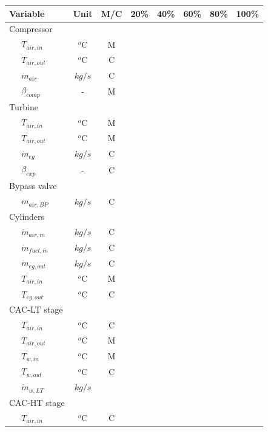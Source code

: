 \documentclass[preprint,12pt]{elsarticle}
\begin{document}
\begin{table}
	\small
	\centering
	\begin{tabular}{llccrrrrr}
		\hline
		\multicolumn{2}{l}{Variable} & Unit & M/C & 20\% & 40\% & 60\% & 80\% & 100\% \\
		\hline
		\multicolumn{2}{l}{Compressor} & & & & & & & \\ 
		& 	$T_{air,in}$  		& $^o$C & M  & &  & & & \\ 
		&	$T_{air,out}$  		& $^o$C & C  & & & & &  \\ 
		&	$\dot{m}_{air}$  	& $kg/s$ & C  & & & & &  \\
		&   $\beta_{comp}$		& - 	& M & & & & &  \\
		\multicolumn{2}{l}{Turbine} & & & & & & &  \\
		&	$T_{air,in}$   		& $^o$C & M  & & & & &  \\ 
		&	$T_{air,out}$  		& $^o$C & M  & & & & &  \\ 
		&	$\dot{m}_{eg}$  	& $kg/s$ & C  & & & & &  \\
		&   $\beta_{exp}$		& - 	& C & & & & &  \\
		\multicolumn{2}{l}{Bypass valve} & & & & & & &  \\
		&	$\dot{m}_{air,BP}$	& $kg/s$ & C  & & & & &  \\ 
		\multicolumn{2}{l}{Cylinders} & & & & & & &   \\
		&	$\dot{m}_{air,in}$  & $kg/s$ & C  & & & & &  \\
		&	$\dot{m}_{fuel,in}$ & $kg/s$ & C  & & & & &  \\
		&	$\dot{m}_{eg,out}$  & $kg/s$ & C  & & & & &  \\
		&	$T_{air,in}$  		& $^o$C & M  & & & & &  \\ 
		&	$T_{eg,out}$  		& $^o$C & C  & & & & &  \\ 
		\multicolumn{2}{l}{CAC-LT stage} & & & & & & &  \\
		&	$T_{air,in}$  		& $^o$C & C  & & & & &  \\ 
		&	$T_{air,out}$ 		& $^o$C & M  & & & & &  \\ 
		&	$T_{w,in}$   		& $^o$C & M  & & & & &  \\ 
		&	$T_{w,out}$   		& $^o$C & C  & & & & &  \\ 
		& 	$\dot{m}_{w,LT}$  	& $kg/s$ & & & & & &  \\
		\multicolumn{2}{l}{CAC-HT stage} & & & & & & & \\
		&	$T_{air,in}$   		& $^o$C & C  & & & & &  \\ 

\end{tabular}
\end{table}
\end{document}

